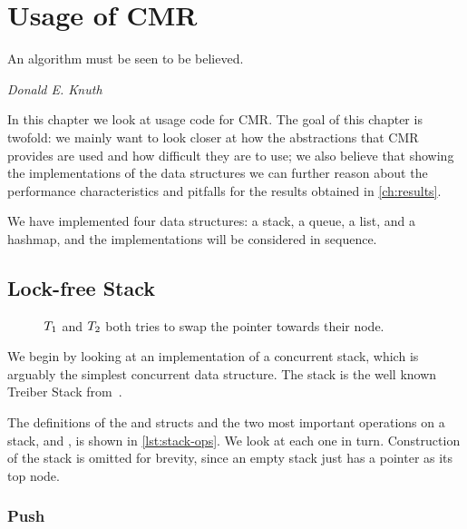 \chapter{Usage of CMR\label{ch:usage}}

\epigraph{An algorithm must be seen to be believed.}{\textit{Donald E. Knuth}}

In this chapter we look at usage code for CMR\@. The goal of this chapter is twofold: we mainly
want to look closer at how the abstractions that CMR provides are used and how difficult they are
to use; we also believe that showing the implementations of the data structures we can further
reason about the performance characteristics and pitfalls for the results obtained in
\cref{ch:results}.

We have implemented four data structures: a stack, a queue, a list, and a hashmap, and the
implementations will be considered in sequence.


\clearpage


\section{Lock-free Stack\label{sec:usage-stack}}

\begin{figure}[b]
\centering

\caption{$T\sb{1}$ and $T\sb{2}$ both tries to swap the  pointer towards their
node.}
\end{figure}

We begin by looking at an implementation of a concurrent stack, which is arguably the simplest
concurrent data structure. The stack is the well known Treiber Stack
from~\cite{treiber1986systems}.

The definitions of the  and  structs and the two most important operations
on a stack,  and , is shown in \cref{lst:stack-ops}. We look at each one in
turn. Construction of the stack is omitted for brevity, since an empty stack just has a 
pointer as its top node.

\begin{figure}[ht]

\end{figure}

\subsection{Push}

